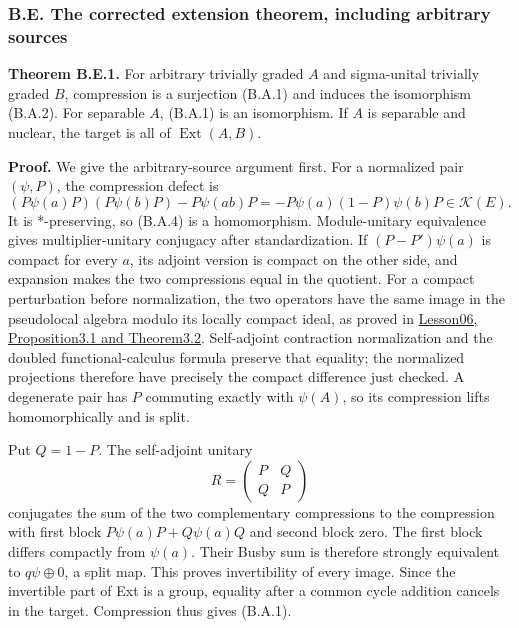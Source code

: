 \documentclass[
  11pt,
]{article}
\begin{document}
\subsubsection{B.E. The corrected extension theorem, including arbitrary
sources}\label{b.e.-the-corrected-extension-theorem-including-arbitrary-sources}

\textbf{Theorem B.E.1.} For arbitrary trivially graded \(A\) and
sigma-unital trivially graded \(B\), compression is a surjection (B.A.1)
and induces the isomorphism (B.A.2). For separable \(A\), (B.A.1) is an
isomorphism. If \(A\) is separable and nuclear, the target is all of
\(\operatorname{Ext}(A,B)\).

\textbf{Proof.} We give the arbitrary-source argument first. For a
normalized pair \((\psi,P)\), the compression defect is \[
(P\psi(a)P)(P\psi(b)P)-P\psi(ab)P
=-P\psi(a)(1-P)\psi(b)P\in\mathcal K(E).
\tag{B.E.1}
\] It is *-preserving, so (B.A.4) is a homomorphism. Module-unitary
equivalence gives multiplier-unitary conjugacy after standardization. If
\((P-P')\psi(a)\) is compact for every \(a\), its adjoint version is
compact on the other side, and expansion makes the two compressions
equal in the quotient. For a compact perturbation before normalization,
the two operators have the same image in the pseudolocal algebra modulo
its locally compact ideal, as proved in
\href{KT-KK-06.html\#3-perturbation-and-normalization}{Lesson06,
Proposition3.1 and Theorem3.2}. Self-adjoint contraction normalization
and the doubled functional-calculus formula preserve that equality; the
normalized projections therefore have precisely the compact difference
just checked. A degenerate pair has \(P\) commuting exactly with
\(\psi(A)\), so its compression lifts homomorphically and is split.

Put \(Q=1-P\). The self-adjoint unitary \[
R=\begin{pmatrix}P&Q\\Q&P\end{pmatrix}
\tag{B.E.2}
\] conjugates the sum of the two complementary compressions to the
compression with first block \(P\psi(a)P+Q\psi(a)Q\) and second block
zero. The first block differs compactly from \(\psi(a)\). Their Busby
sum is therefore strongly equivalent to \(q\psi\oplus0\), a split map.
This proves invertibility of every image. Since the invertible part of
Ext is a group, equality after a common cycle addition cancels in the
target. Compression thus gives (B.A.1).
\end{document}
